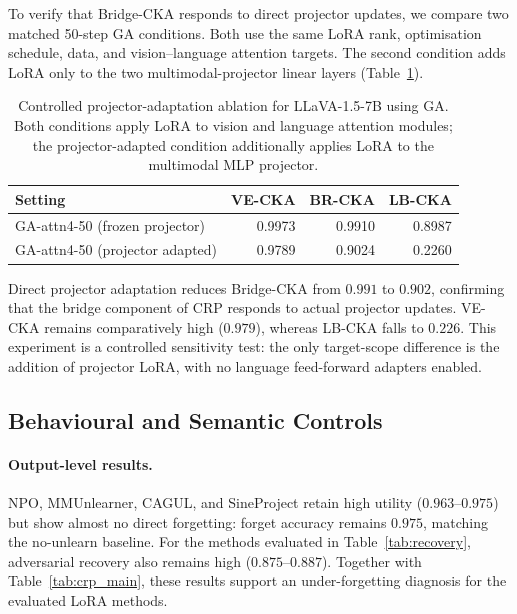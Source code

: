 \documentclass[letterpaper]{article}
\begin{document}
To verify that Bridge-CKA responds to direct projector updates, we compare
two matched 50-step GA conditions. Both use the same LoRA rank, optimisation
schedule, data, and vision--language attention targets. The second condition
adds LoRA only to the two multimodal-projector linear layers
(Table~\ref{tab:bridge_ablation}).

\begin{table}[t]
\centering
\caption{Controlled projector-adaptation ablation for LLaVA-1.5-7B using
GA. Both conditions apply LoRA to vision and language attention modules;
the projector-adapted condition additionally applies LoRA to the multimodal
MLP projector.}
\label{tab:bridge_ablation}
\setlength{\tabcolsep}{5pt}
\small
\begin{tabular}{lrrr}
\toprule
\textbf{Setting} & \textbf{VE-CKA} & \textbf{BR-CKA} & \textbf{LB-CKA} \\
\midrule
GA-attn4-50 (frozen projector) & 0.9973 & 0.9910 & 0.8987 \\
GA-attn4-50 (projector adapted) & 0.9789 & 0.9024 & 0.2260 \\
\bottomrule
\end{tabular}
\end{table}

Direct projector adaptation reduces Bridge-CKA from $0.991$ to $0.902$,
confirming that the bridge component of CRP responds to actual projector
updates. VE-CKA remains comparatively high ($0.979$), whereas LB-CKA falls
to $0.226$. This experiment is a controlled sensitivity test: the only
target-scope difference is the addition of projector LoRA, with no language
feed-forward adapters enabled.

\subsection{Behavioural and Semantic Controls}

\paragraph{Output-level results.}
NPO, MMUnlearner, CAGUL, and SineProject retain high utility
($0.963$--$0.975$) but show almost no direct forgetting: forget accuracy
remains $0.975$, matching the no-unlearn baseline. For the methods evaluated
in Table~\ref{tab:recovery}, adversarial recovery also remains high
($0.875$--$0.887$). Together with Table~\ref{tab:crp_main}, these results
support an under-forgetting diagnosis for the evaluated LoRA methods.
\end{document}
